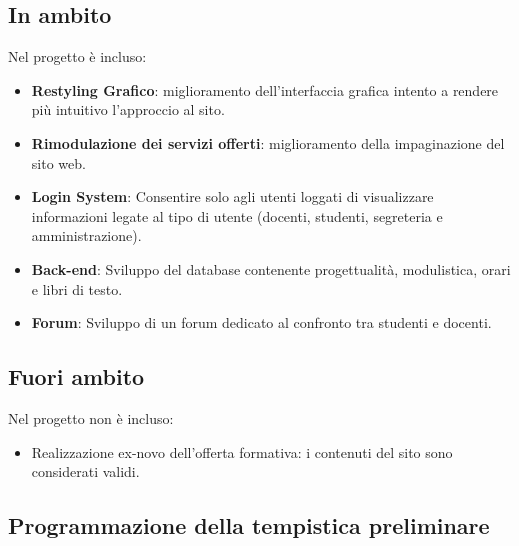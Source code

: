 \documentclass{article}
\begin{document}
\begin{flushleft}
		
		\subsection{In ambito}
		
		Nel progetto è incluso:\\
		
		\begin{itemize}
			
			\item \textbf{Restyling Grafico}: miglioramento dell'interfaccia grafica intento a rendere più intuitivo l'approccio al sito. 
			
			\item \textbf{Rimodulazione dei servizi offerti}: miglioramento della impaginazione del sito web.
			
			\item \textbf{Login System}: Consentire solo agli utenti loggati di visualizzare informazioni legate al tipo di utente (docenti, studenti, segreteria e amministrazione).
			
			\item \textbf{Back-end}: Sviluppo del database contenente progettualità, modulistica, orari e libri di testo.
			
			\item \textbf{Forum}: Sviluppo di un forum dedicato al confronto tra  studenti e docenti.
			
		\end{itemize}
		
		\subsection{Fuori ambito}
		
		Nel progetto non è incluso:
		
		\begin{itemize}
			
			\item Realizzazione ex-novo dell'offerta formativa: i contenuti del sito sono considerati validi.
			
		\end{itemize}
		
		\vspace{2mm}
		
		\subsection{Programmazione della tempistica preliminare}
		

\end{flushleft}
\end{document}
